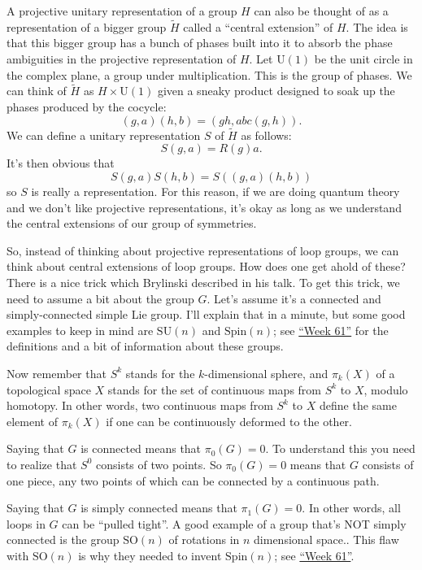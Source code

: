 \documentclass{article}
\begin{document}
A projective unitary representation of a group \(H\) can also be thought
of as a representation of a bigger group \(\widetilde{H}\) called a
``central extension'' of \(H\). The idea is that this bigger group has a
bunch of phases built into it to absorb the phase ambiguities in the
projective representation of \(H\). Let \(\mathrm{U}(1)\) be the unit
circle in the complex plane, a group under multiplication. This is the
group of phases. We can think of \(\widetilde{H}\) as
\(H \times \mathrm{U}(1)\) given a sneaky product designed to soak up
the phases produced by the cocycle: \[(g, a)(h, b) = (gh, ab c(g,h)).\]
We can define a unitary representation \(S\) of \(\widetilde{H}\) as
follows: \[S(g, a) = R(g)a.\] It's then obvious that
\[S(g, a) S(h, b) = S((g, a)(h, b))\] so \(S\) is really a
representation. For this reason, if we are doing quantum theory and we
don't like projective representations, it's okay as long as we
understand the central extensions of our group of symmetries.

So, instead of thinking about projective representations of loop groups,
we can think about central extensions of loop groups. How does one get
ahold of these? There is a nice trick which Brylinski described in his
talk. To get this trick, we need to assume a bit about the group \(G\).
Let's assume it's a connected and simply-connected simple Lie group.
I'll explain that in a minute, but some good examples to keep in mind
are \(\mathrm{SU}(n)\) and \(\mathrm{Spin}(n)\); see
\protect\hyperlink{week61}{``Week 61''} for the definitions and a bit of
information about these groups.

Now remember that \(S^k\) stands for the \(k\)-dimensional sphere, and
\(\pi_k(X)\) of a topological space \(X\) stands for the set of
continuous maps from \(S^k\) to \(X\), modulo homotopy. In other words,
two continuous maps from \(S^k\) to \(X\) define the same element of
\(\pi_k(X)\) if one can be continuously deformed to the other.

Saying that \(G\) is connected means that \(\pi_0(G) = 0\). To
understand this you need to realize that \(S^0\) consists of two points.
So \(\pi_0(G) = 0\) means that \(G\) consists of one piece, any two
points of which can be connected by a continuous path.

Saying that \(G\) is simply connected means that \(\pi_1(G) = 0\). In
other words, all loops in \(G\) can be ``pulled tight''. A good example
of a group that's NOT simply connected is the group \(\mathrm{SO}(n)\)
of rotations in \(n\) dimensional space.. This flaw with
\(\mathrm{SO}(n)\) is why they needed to invent \(\mathrm{Spin}(n)\);
see \protect\hyperlink{week61}{``Week 61''}.
\end{document}

